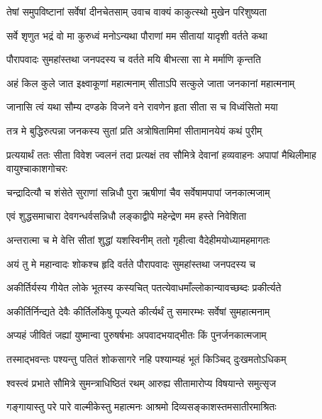 
\twolineshloka
{तेषां समुपविष्टानां सर्वेषां दीनचेतसाम्}
{उवाच वाक्यं काकुत्स्थो मुखेन परिशुष्यता} %

\twolineshloka
{सर्वे शृणुत भद्रं वो मा कुरुध्वं मनोऽन्यथा}
{पौराणां मम सीतायां यादृशी वर्तते कथा} %

\twolineshloka
{पौरापवादः सुमहांस्तथा जनपदस्य च}
{वर्तते मयि बीभत्सा सा मे मर्माणि कृन्तति} %

\twolineshloka
{अहं किल कुले जात इक्ष्वाकूणां महात्मनाम्}
{सीताऽपि सत्कुले जाता जनकानां महात्मनाम्} %

\twolineshloka
{जानासि त्वं यथा सौम्य दण्डके विजने वने}
{रावणेन हृता सीता स च विध्वंसितो मया} %

\twolineshloka
{तत्र मे बुद्धिरुत्पन्ना जनकस्य सुतां प्रति}
{अत्रोषितामिमां सीतामानयेयं कथं पुरीम्} %

\threelineshloka
{प्रत्ययार्थं ततः सीता विवेश ज्वलनं तदा}
{प्रत्यक्षं तव सौमित्रे देवानां हव्यवाहनः}
{अपापां मैथिलीमाह वायुश्चाकाशगोचरः} %

\twolineshloka
{चन्द्रादित्यौ च शंसेते सुराणां सन्निधौ पुरा}
{ऋषीणां चैव सर्वेषामपापां जनकात्मजाम्} %

\twolineshloka
{एवं शुद्धसमाचारा देवगन्धर्वसन्निधौ}
{लङ्काद्वीपे महेन्द्रेण मम हस्ते निवेशिता} %

\twolineshloka
{अन्तरात्मा च मे वेत्ति सीतां शुद्धां यशस्विनीम्}
{ततो गृहीत्वा वैदेहीमयोध्यामहमागतः} %

\twolineshloka
{अयं तु मे महान्वादः शोकश्च हृदि वर्तते}
{पौरापवादः सुमहांस्तथा जनपदस्य च} %

\twolineshloka
{अकीर्तिर्यस्य गीयेत लोके भूतस्य कस्यचित्}
{पतत्येवाधमाँल्लोकान्यावच्छब्दः प्रकीर्त्यते} %

\twolineshloka
{अकीर्तिर्निन्द्यते देवैः कीर्तिर्लोकेषु पूज्यते}
{कीर्त्यर्थं तु समारम्भः सर्वेषां सुमहात्मनाम्} %

\twolineshloka
{अप्यहं जीवितं जह्यां युष्मान्वा पुरुषर्षभाः}
{अपवादभयाद्भीतः किं पुनर्जनकात्मजाम्} %

\twolineshloka
{तस्माद्भवन्तः पश्यन्तु पतितं शोकसागरे}
{नहि पश्याम्यहं भूतं किञ्चिद् दुःखमतोऽधिकम्} %

\twolineshloka
{श्वस्त्वं प्रभाते सौमित्रे सुमन्त्राधिष्ठितं रथम्}
{आरुह्य सीतामारोप्य विषयान्ते समुत्सृज} %

\twolineshloka
{गङ्गायास्तु परे पारे वाल्मीकेस्तु महात्मनः}
{आश्रमो दिव्यसङ्काशस्तमसातीरमाश्रितः} %

